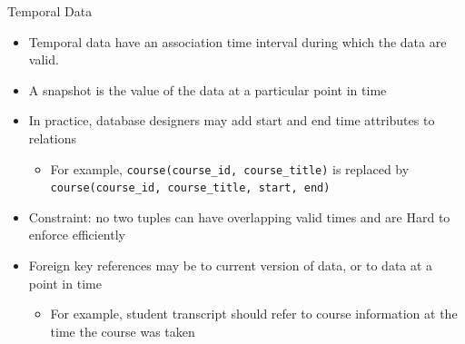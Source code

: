 \documentclass[aspectratio=169, xcolor=dvipsnames]{beamer}
\begin{document}
\begin{frame}{Temporal Data}
    \begin{itemize}[<+->]
        \item Temporal data have an association time interval during which the data are valid.
        \item A snapshot is the value of the data at a particular point in time
        \item In practice, database designers may add start and end time attributes to relations
        \begin{itemize}
            \item[$\triangleright$] For example, \texttt{course(course\_id, course\_title)} is replaced by \texttt{course(course\_id, course\_title, start, end)}
        \end{itemize}
        \item Constraint: no two tuples can have overlapping valid times and are Hard to enforce efficiently
        \item Foreign key references may be to current version of data, or to data at a point in time
        \begin{itemize}
            \item[$\triangleright$] For example, student transcript should refer to course information at the time the course was taken
        \end{itemize}
    \end{itemize}
\end{frame}
\end{document}
